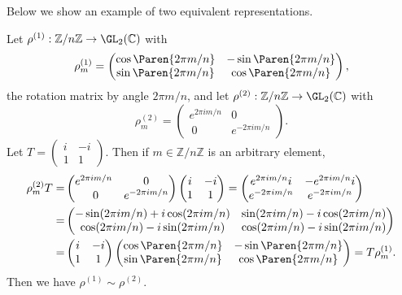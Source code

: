 \documentclass[../Project.tex]{subfiles}
\begin{document}
Below we show an example of two equivalent representations.

\begin{exam}[{\cite[Example 3.1.8]{1}}]
	Let $\rho^{(1)} : \mathbb{Z}/n\mathbb{Z} \to \GL_2(\mathbb{C})$ with
	$$\rho^{(1)}_{m} = \begin{pmatrix}\cos\Paren{{2 \pi m}/{n}} & -\sin\Paren{{2 \pi m}/{n}}\\ \sin\Paren{{2 \pi m}/{n}} & \cos\Paren{{2 \pi m}/{n}}\end{pmatrix},$$
	the rotation matrix by angle $2\pi m/n$, and let $\rho^{(2)} : \mathbb{Z}/n\mathbb{Z} \to \GL_2(\mathbb{C})$ with
	$$\rho^{(2)}_{m} = \begin{pmatrix}e^{2 \pi i m/n} & 0 \\\ 0 & e^{-2 \pi i m/n}\end{pmatrix}.$$
	Let $T = \begin{pmatrix}i & -i\\1 & 1\end{pmatrix}$. Then if $m \in \mathbb{Z}/n\mathbb{Z}$ is an arbitrary element,
\begin{align*}	
	\rho^{(2)}_{m}T = &\begin{pmatrix}e^{2 \pi i m/n} & 0 \\\ 0 & e^{-2 \pi i m/n}\end{pmatrix} \begin{pmatrix}i & -i\\1 & 1\end{pmatrix} = \begin{pmatrix}e^{2 \pi i m/n}i & -e^{2 \pi i m/n}i \\ e^{-2 \pi i m/n} & e^{-2 \pi i m/n}\end{pmatrix}\\ = &\begin{pmatrix}-\sin(2\pi i m/n) + i\cos(2\pi i m/n) & \sin(2\pi i m/n) - i\cos(2\pi i m/n)\\ \cos(2\pi i m/n) - i \sin(2\pi i m/n) & \cos(2\pi i m/n) - i \sin(2\pi i m/n)\end{pmatrix}\\
	= & \begin{pmatrix}i & -i\\1 & 1\end{pmatrix}\begin{pmatrix}\cos\Paren{{2 \pi m}/{n}} & -\sin\Paren{{2 \pi m}/{n}}\\ \sin\Paren{{2 \pi m}/{n}} & \cos\Paren{{2 \pi m}/{n}}\end{pmatrix} =  T\rho^{(1)}_{m}.
\end{align*}
	Then we have $\rho^{(1)} \sim \rho^{(2)}$.\\
\end{exam}
\end{document}
